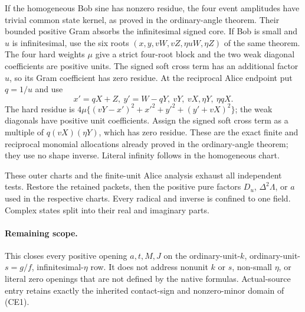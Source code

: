 If the homogeneous Bob sine has nonzero residue, the four event
amplitudes have trivial common state kernel, as proved in the
ordinary-angle theorem. Their bounded positive Gram absorbs the
infinitesimal signed core. If Bob is small and $u$ is infinitesimal,
use the six roots
$(x,y,vW,vZ,\eta uW,\eta Z)$ of the same theorem. The four hard
weights $\mu$ give a strict four-root block and the two weak diagonal
coefficients are positive units. The signed soft cross term has an
additional factor $u$, so its Gram coefficient has zero residue.
At the reciprocal Alice endpoint put $q=1/u$ and use
\[
                x'=qX+Z,\ y'=W-qY,\ vY,\ vX,
                       \eta Y,\ \eta qX.
\]
The hard residue is
$4\mu\{(vY-x')^2+x'^2+y'^2+(y'+vX)^2\}$;
the weak diagonals have positive unit coefficients. Assign the signed
soft cross term as a multiple of $q(vX)(\eta Y)$, which has zero
residue. These are the exact finite and reciprocal monomial
allocations already proved in the ordinary-angle theorem; they use
no shape inverse. Literal infinity follows in the homogeneous chart.

These outer charts and the finite-unit Alice analysis exhaust all
independent tests. Restore the retained packets, then the positive
pure factors $D_u$, $\Delta^2\Lambda$, or $a$ used in the respective
charts. Every radical and inverse is confined to one field. Complex
states split into their real and imaginary parts.

\paragraph{Remaining scope.}
This closes every positive opening $a,t,M,J$ on the ordinary-unit-$k$,
ordinary-unit-$s=g/f$, infinitesimal-$\eta$ row. It does not address
nonunit $k$ or $s$, non-small $\eta$, or literal zero openings that
are not defined by the native formulas. Actual-source entry retains
exactly the inherited contact-sign and nonzero-minor domain of (CE1).
